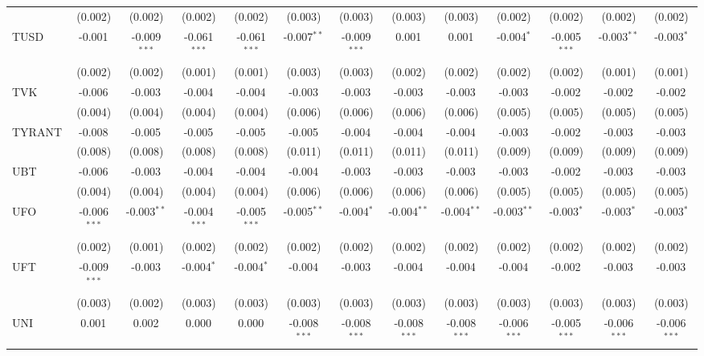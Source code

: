 \begin{table}[!htbp]
\begin{tabular}{@{\extracolsep{5pt}}lcccccccccccc}
  & (0.002) & (0.002) & (0.002) & (0.002) & (0.003) & (0.003) & (0.003) & (0.003) & (0.002) & (0.002) & (0.002) & (0.002) \\
 TUSD & -0.001$^{}$ & -0.009$^{***}$ & -0.061$^{***}$ & -0.061$^{***}$ & -0.007$^{**}$ & -0.009$^{***}$ & 0.001$^{}$ & 0.001$^{}$ & -0.004$^{*}$ & -0.005$^{***}$ & -0.003$^{**}$ & -0.003$^{*}$ \\
  & (0.002) & (0.002) & (0.001) & (0.001) & (0.003) & (0.003) & (0.002) & (0.002) & (0.002) & (0.002) & (0.001) & (0.001) \\
 TVK & -0.006$^{}$ & -0.003$^{}$ & -0.004$^{}$ & -0.004$^{}$ & -0.003$^{}$ & -0.003$^{}$ & -0.003$^{}$ & -0.003$^{}$ & -0.003$^{}$ & -0.002$^{}$ & -0.002$^{}$ & -0.002$^{}$ \\
  & (0.004) & (0.004) & (0.004) & (0.004) & (0.006) & (0.006) & (0.006) & (0.006) & (0.005) & (0.005) & (0.005) & (0.005) \\
 TYRANT & -0.008$^{}$ & -0.005$^{}$ & -0.005$^{}$ & -0.005$^{}$ & -0.005$^{}$ & -0.004$^{}$ & -0.004$^{}$ & -0.004$^{}$ & -0.003$^{}$ & -0.002$^{}$ & -0.003$^{}$ & -0.003$^{}$ \\
  & (0.008) & (0.008) & (0.008) & (0.008) & (0.011) & (0.011) & (0.011) & (0.011) & (0.009) & (0.009) & (0.009) & (0.009) \\
 UBT & -0.006$^{}$ & -0.003$^{}$ & -0.004$^{}$ & -0.004$^{}$ & -0.004$^{}$ & -0.003$^{}$ & -0.003$^{}$ & -0.003$^{}$ & -0.003$^{}$ & -0.002$^{}$ & -0.003$^{}$ & -0.003$^{}$ \\
  & (0.004) & (0.004) & (0.004) & (0.004) & (0.006) & (0.006) & (0.006) & (0.006) & (0.005) & (0.005) & (0.005) & (0.005) \\
 UFO & -0.006$^{***}$ & -0.003$^{**}$ & -0.004$^{***}$ & -0.005$^{***}$ & -0.005$^{**}$ & -0.004$^{*}$ & -0.004$^{**}$ & -0.004$^{**}$ & -0.003$^{**}$ & -0.003$^{*}$ & -0.003$^{*}$ & -0.003$^{*}$ \\
  & (0.002) & (0.001) & (0.002) & (0.002) & (0.002) & (0.002) & (0.002) & (0.002) & (0.002) & (0.002) & (0.002) & (0.002) \\
 UFT & -0.009$^{***}$ & -0.003$^{}$ & -0.004$^{*}$ & -0.004$^{*}$ & -0.004$^{}$ & -0.003$^{}$ & -0.004$^{}$ & -0.004$^{}$ & -0.004$^{}$ & -0.002$^{}$ & -0.003$^{}$ & -0.003$^{}$ \\
  & (0.003) & (0.002) & (0.003) & (0.003) & (0.003) & (0.003) & (0.003) & (0.003) & (0.003) & (0.003) & (0.003) & (0.003) \\
 UNI & 0.001$^{}$ & 0.002$^{}$ & 0.000$^{}$ & 0.000$^{}$ & -0.008$^{***}$ & -0.008$^{***}$ & -0.008$^{***}$ & -0.008$^{***}$ & -0.006$^{***}$ & -0.005$^{***}$ & -0.006$^{***}$ & -0.006$^{***}$ \\

\end{tabular}
\end{table}
